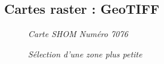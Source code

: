 \subsection{Cartes raster : GeoTIFF}
\begin{center}
\begin{figure}[ht]
\caption{\label{equiProj}\textit{Carte SHOM Numéro 7076}}
\end{figure}
\end{center}
\begin{center}
\begin{figure}[ht]
\caption{\label{equiProj}\textit{Sélection d'une zone plus petite}}
\end{figure}
\end{center}
